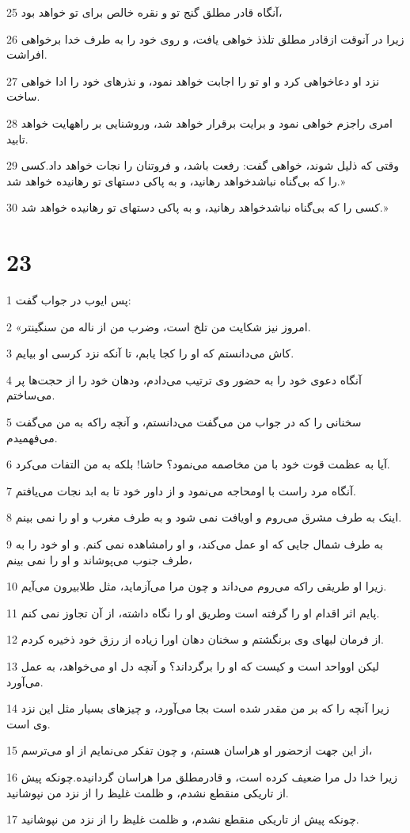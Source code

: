 \par 25 آنگاه قادر مطلق گنج تو و نقره خالص برای تو خواهد بود،
\par 26 زیرا در آنوقت ازقادر مطلق تلذذ خواهی یافت، و روی خود را به طرف خدا برخواهی افراشت.
\par 27 نزد او دعاخواهی کرد و او تو را اجابت خواهد نمود، و نذرهای خود را ادا خواهی ساخت.
\par 28 امری راجزم خواهی نمود و برایت برقرار خواهد شد، وروشنایی بر راههایت خواهد تابید.
\par 29 وقتی که ذلیل شوند، خواهی گفت: رفعت باشد، و فروتنان را نجات خواهد داد.کسی را که بی‌گناه نباشدخواهد رهانید، و به پاکی دستهای تو رهانیده خواهد شد.»
\par 30 کسی را که بی‌گناه نباشدخواهد رهانید، و به پاکی دستهای تو رهانیده خواهد شد.»
 
\chapter{23}

\par 1 پس ایوب در جواب گفت:
\par 2 «امروز نیز شکایت من تلخ است، وضرب من از ناله من سنگینتر.
\par 3 کاش می‌دانستم که او را کجا یابم، تا آنکه نزد کرسی او بیایم.
\par 4 آنگاه دعوی خود را به حضور وی ترتیب می‌دادم، ودهان خود را از حجت‌ها پر می‌ساختم.
\par 5 سخنانی را که در جواب من می‌گفت می‌دانستم، و آنچه راکه به من می‌گفت می‌فهمیدم.
\par 6 آیا به عظمت قوت خود با من مخاصمه می‌نمود؟ حاشا! بلکه به من التفات می‌کرد.
\par 7 آنگاه مرد راست با اومحاجه می‌نمود و از داور خود تا به ابد نجات می‌یافتم.
\par 8 اینک به طرف مشرق می‌روم و اویافت نمی شود و به طرف مغرب و او را نمی بینم.
\par 9 به طرف شمال جایی که او عمل می‌کند، و او رامشاهده نمی کنم. و او خود را به طرف جنوب می‌پوشاند و او را نمی بینم،
\par 10 زیرا او طریقی راکه می‌روم می‌داند و چون مرا می‌آزماید، مثل طلابیرون می‌آیم.
\par 11 پایم اثر اقدام او را گرفته است وطریق او را نگاه داشته، از آن تجاوز نمی کنم.
\par 12 از فرمان لبهای وی برنگشتم و سخنان دهان اورا زیاده از رزق خود ذخیره کردم.
\par 13 لیکن اوواحد است و کیست که او را برگرداند؟ و آنچه دل او می‌خواهد، به عمل می‌آورد.
\par 14 زیرا آنچه را که بر من مقدر شده است بجا می‌آورد، و چیزهای بسیار مثل این نزد وی است.
\par 15 از این جهت ازحضور او هراسان هستم، و چون تفکر می‌نمایم از او می‌ترسم،
\par 16 زیرا خدا دل مرا ضعیف کرده است، و قادرمطلق مرا هراسان گردانیده.چونکه پیش از تاریکی منقطع نشدم، و ظلمت غلیظ را از نزد من نپوشانید.
\par 17 چونکه پیش از تاریکی منقطع نشدم، و ظلمت غلیظ را از نزد من نپوشانید.
 
